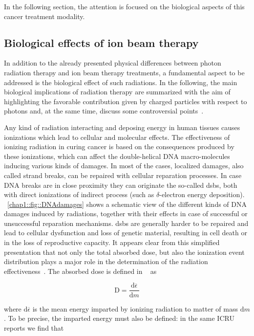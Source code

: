 In the following section, the attention is focused on the biological aspects of this cancer treatment modality.


\subsection{Biological effects of ion beam therapy}\label{chap1::subsec::bioEffects} 
In addition to the already presented physical differences between photon radiation therapy and ion beam therapy treatments, a fundamental aspect to be addressed is the biological effect of such radiations. In the following, the main biological implications of radiation therapy are summarized with the aim of highlighting the favorable contribution given by charged particles with respect to photons and, at the same time, discuss some controversial points~\parencite{Paganetti2013}.

Any kind of radiation interacting and deposing energy in human tissues causes ionizations which lead to cellular and molecular effects. The effectiveness of ionizing radiation in curing cancer is based on the consequences produced by these ionizations, which can affect the double-helical DNA macro-molecules inducing various kinds of damages. In most of the cases, localized damages, also called strand breaks, can be repaired with cellular reparation processes. In case DNA breaks are in close proximity they can originate the so-called \glspl{dsb}, both with direct ionizations of indirect process (such as $\delta$-electron energy deposition). \figurename~\ref{chap1::fig::DNAdamages} shows a schematic view of the different kinds of DNA damages induced by radiations, together with their effects in case of  successful or unsuccessful reparation mechanisms. \glspl{dsb} are generally harder to be repaired and lead to cellular dysfunction and loss of genetic material, resulting in cell death or in the loss of reproductive capacity. It appears clear from this simplified presentation that not only the total absorbed dose, but also the ionization event distribution plays a major role in the determination of the radiation effectiveness~\parencite{Belli1992}.        
The absorbed dose is defined in ~\cite{ICRU1980, ICRU1998} as 

\begin{equation}
\mathrm{D} = \frac{\mathrm{d}\overline{\epsilon}}{\mathrm{d}m}
\label{chap1::eq::AbsDoseDef}
\end{equation}

where $\mathrm{d}\overline{\epsilon}$ is the mean energy imparted by ionizing radiation to matter of mass $\mathrm{d}m$. To be precise, the imparted energy must also be defined: in the same ICRU reports we find that 

